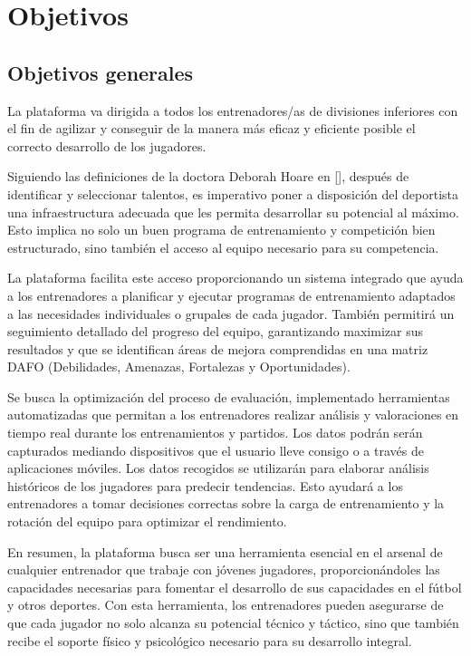 
\chapter{Objetivos}
\label{objetivos}

\section{Objetivos generales}
La plataforma va dirigida a todos los entrenadores/as de divisiones inferiores con el fin de agilizar y conseguir de la manera más eficaz y eficiente posible el correcto desarrollo de los jugadores.

Siguiendo las definiciones de la doctora Deborah Hoare en [\cite{DHoare}], después de identificar y seleccionar talentos, es imperativo poner a disposición del deportista una infraestructura adecuada que les permita desarrollar su potencial al máximo. Esto implica no solo un buen programa de entrenamiento y competición bien estructurado, sino también el acceso al equipo necesario para su competencia.

La plataforma facilita este acceso proporcionando un sistema integrado que ayuda a los entrenadores a planificar y ejecutar programas de entrenamiento adaptados a las necesidades individuales o grupales de cada jugador. También permitirá un seguimiento detallado del progreso del equipo, garantizando maximizar sus resultados y que se identifican áreas de mejora comprendidas en una matriz DAFO (Debilidades, Amenazas, Fortalezas y Oportunidades).

Se busca la optimización del proceso de evaluación, implementado herramientas automatizadas que permitan a los entrenadores realizar análisis y valoraciones en tiempo real durante los entrenamientos y partidos. Los datos podrán serán capturados mediando dispositivos que el usuario lleve consigo o a través de aplicaciones móviles.
Los datos recogidos se utilizarán para elaborar análisis históricos de los jugadores para predecir tendencias. Esto ayudará a los entrenadores a tomar decisiones correctas sobre la carga de entrenamiento y la rotación del equipo para optimizar el rendimiento.

En resumen, la plataforma busca ser una herramienta esencial en el arsenal de cualquier entrenador que trabaje con jóvenes jugadores, proporcionándoles las capacidades necesarias para fomentar el desarrollo de sus capacidades en el fútbol y otros deportes. Con esta herramienta, los entrenadores pueden asegurarse de que cada jugador no solo alcanza su potencial técnico y táctico, sino que también recibe el soporte físico y psicológico necesario para su desarrollo integral.

